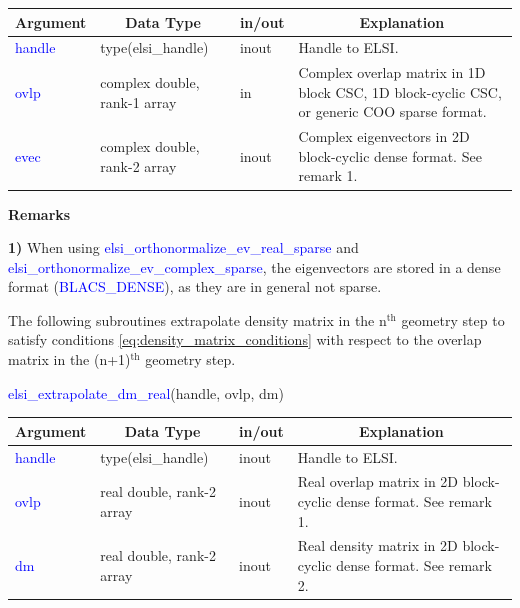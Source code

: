 \documentclass{report}
\begin{document}
\begin{tabular}[]{|p{20mm}|p{45mm}|p{15mm}|p{85mm}|}
\hline
\multicolumn{1}{|c|}{\textbf{Argument}} & \multicolumn{1}{c|}{\textbf{Data Type}} & \multicolumn{1}{c|}{\textbf{in/out}} & \multicolumn{1}{c|}{\textbf{Explanation}}\\
\hline
\textcolor{blue}{handle} & type(elsi\_handle)           & inout & Handle to ELSI.\\
\hline
\textcolor{blue}{ovlp}   & complex double, rank-1 array & in    & Complex overlap matrix in 1D block CSC, 1D block-cyclic CSC, or generic COO sparse format.\\
\hline
\textcolor{blue}{evec}   & complex double, rank-2 array & inout & Complex eigenvectors in 2D block-cyclic dense format.  See remark 1.\\
\hline
\end{tabular}

\textbf{Remarks}

\textbf{1)} When using \textcolor{blue}{elsi\_orthonormalize\_ev\_real\_sparse} and \textcolor{blue}{elsi\_orthonormalize\_ev\_complex\_sparse}, the eigenvectors are stored in a dense format (\textcolor{blue}{BLACS\_DENSE}), as they are in general not sparse.

The following subroutines extrapolate density matrix in the n$^\text{th}$ geometry step to satisfy conditions \ref{eq:density_matrix_conditions} with respect to the overlap matrix in the (n+1)$^\text{th}$ geometry step.

\newpage
\begin{labeling}{\hspace{6cm}}
\item [\hspace{0.3cm} \textcolor{blue}{elsi\_extrapolate\_dm\_real}(handle, ovlp, dm)]
\end{labeling}

\begin{tabular}[]{|p{20mm}|p{45mm}|p{15mm}|p{85mm}|}
\hline
\multicolumn{1}{|c|}{\textbf{Argument}} & \multicolumn{1}{c|}{\textbf{Data Type}} & \multicolumn{1}{c|}{\textbf{in/out}} & \multicolumn{1}{c|}{\textbf{Explanation}}\\
\hline
\textcolor{blue}{handle} & type(elsi\_handle)        & inout & Handle to ELSI.\\
\hline
\textcolor{blue}{ovlp}   & real double, rank-2 array & inout & Real overlap matrix in 2D block-cyclic dense format.  See remark 1.\\
\hline
\textcolor{blue}{dm}     & real double, rank-2 array & inout & Real density matrix in 2D block-cyclic dense format.  See remark 2.\\
\hline
\end{tabular}
\end{document}
